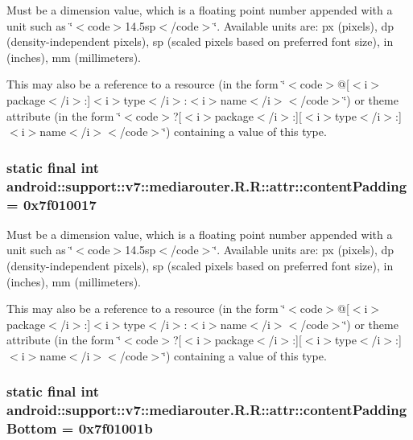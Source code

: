 Must be a dimension value, which is a floating point number appended with a unit such as \char`\"{}$<$code$>$14.5sp$<$/code$>$\char`\"{}. Available units are: px (pixels), dp (density-independent pixels), sp (scaled pixels based on preferred font size), in (inches), mm (millimeters). 

This may also be a reference to a resource (in the form \char`\"{}$<$code$>$@\mbox{[}$<$i$>$package$<$/i$>$:\mbox{]}$<$i$>$type$<$/i$>$:$<$i$>$name$<$/i$>$$<$/code$>$\char`\"{}) or theme attribute (in the form \char`\"{}$<$code$>$?\mbox{[}$<$i$>$package$<$/i$>$:\mbox{]}\mbox{[}$<$i$>$type$<$/i$>$:\mbox{]}$<$i$>$name$<$/i$>$$<$/code$>$\char`\"{}) containing a value of this type. \hypertarget{classandroid_1_1support_1_1v7_1_1mediarouter_1_1_r_1_1attr_07cda81a185a74463542ca95a9d42bf4}{
\subsubsection[{contentPadding}]{\setlength{\rightskip}{0pt plus 5cm}static final int android::support::v7::mediarouter.R.R::attr::contentPadding = 0x7f010017}}
\label{classandroid_1_1support_1_1v7_1_1mediarouter_1_1_r_1_1attr_07cda81a185a74463542ca95a9d42bf4}


Must be a dimension value, which is a floating point number appended with a unit such as \char`\"{}$<$code$>$14.5sp$<$/code$>$\char`\"{}. Available units are: px (pixels), dp (density-independent pixels), sp (scaled pixels based on preferred font size), in (inches), mm (millimeters). 

This may also be a reference to a resource (in the form \char`\"{}$<$code$>$@\mbox{[}$<$i$>$package$<$/i$>$:\mbox{]}$<$i$>$type$<$/i$>$:$<$i$>$name$<$/i$>$$<$/code$>$\char`\"{}) or theme attribute (in the form \char`\"{}$<$code$>$?\mbox{[}$<$i$>$package$<$/i$>$:\mbox{]}\mbox{[}$<$i$>$type$<$/i$>$:\mbox{]}$<$i$>$name$<$/i$>$$<$/code$>$\char`\"{}) containing a value of this type. \hypertarget{classandroid_1_1support_1_1v7_1_1mediarouter_1_1_r_1_1attr_42d637b114d422ee39af5639db8cc9c3}{
\subsubsection[{contentPaddingBottom}]{\setlength{\rightskip}{0pt plus 5cm}static final int android::support::v7::mediarouter.R.R::attr::contentPaddingBottom = 0x7f01001b}}
\label{classandroid_1_1support_1_1v7_1_1mediarouter_1_1_r_1_1attr_42d637b114d422ee39af5639db8cc9c3}


